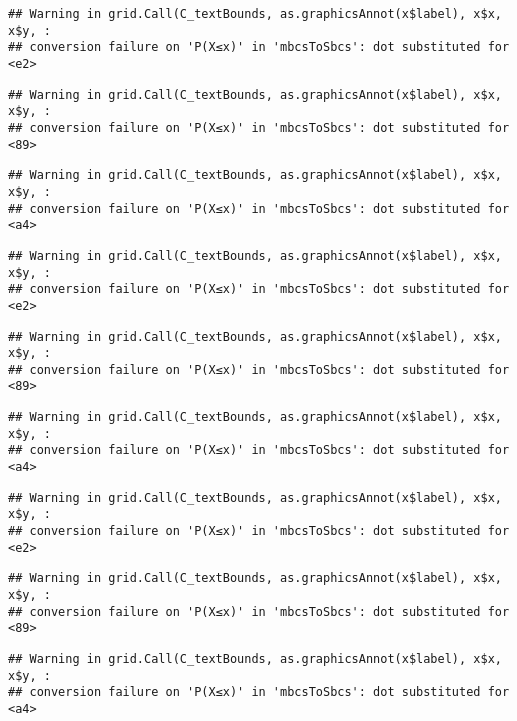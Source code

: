 \documentclass[
]{book}
\begin{document}
\begin{verbatim}
## Warning in grid.Call(C_textBounds, as.graphicsAnnot(x$label), x$x, x$y, :
## conversion failure on 'P(X≤x)' in 'mbcsToSbcs': dot substituted for <e2>
\end{verbatim}

\begin{verbatim}
## Warning in grid.Call(C_textBounds, as.graphicsAnnot(x$label), x$x, x$y, :
## conversion failure on 'P(X≤x)' in 'mbcsToSbcs': dot substituted for <89>
\end{verbatim}

\begin{verbatim}
## Warning in grid.Call(C_textBounds, as.graphicsAnnot(x$label), x$x, x$y, :
## conversion failure on 'P(X≤x)' in 'mbcsToSbcs': dot substituted for <a4>
\end{verbatim}

\begin{verbatim}
## Warning in grid.Call(C_textBounds, as.graphicsAnnot(x$label), x$x, x$y, :
## conversion failure on 'P(X≤x)' in 'mbcsToSbcs': dot substituted for <e2>
\end{verbatim}

\begin{verbatim}
## Warning in grid.Call(C_textBounds, as.graphicsAnnot(x$label), x$x, x$y, :
## conversion failure on 'P(X≤x)' in 'mbcsToSbcs': dot substituted for <89>
\end{verbatim}

\begin{verbatim}
## Warning in grid.Call(C_textBounds, as.graphicsAnnot(x$label), x$x, x$y, :
## conversion failure on 'P(X≤x)' in 'mbcsToSbcs': dot substituted for <a4>
\end{verbatim}

\begin{verbatim}
## Warning in grid.Call(C_textBounds, as.graphicsAnnot(x$label), x$x, x$y, :
## conversion failure on 'P(X≤x)' in 'mbcsToSbcs': dot substituted for <e2>
\end{verbatim}

\begin{verbatim}
## Warning in grid.Call(C_textBounds, as.graphicsAnnot(x$label), x$x, x$y, :
## conversion failure on 'P(X≤x)' in 'mbcsToSbcs': dot substituted for <89>
\end{verbatim}

\begin{verbatim}
## Warning in grid.Call(C_textBounds, as.graphicsAnnot(x$label), x$x, x$y, :
## conversion failure on 'P(X≤x)' in 'mbcsToSbcs': dot substituted for <a4>
\end{verbatim}
\end{document}
